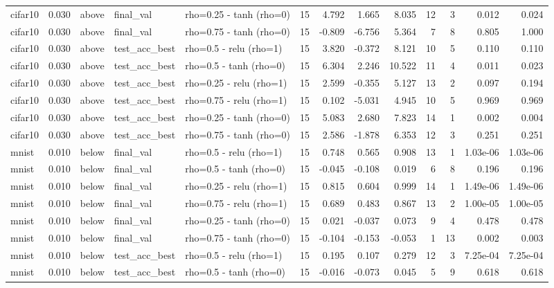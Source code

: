 \begin{table}[htbp]
{\begin{tabular}{@{}lrlllrrrrrrrr@{}}
cifar10 & 0.030 & above & final\_val & rho=0.25 - tanh (rho=0) & 15 & 4.792 & 1.665 & 8.035 & 12 & 3 & 0.012 & 0.024 \\
cifar10 & 0.030 & above & final\_val & rho=0.75 - tanh (rho=0) & 15 & -0.809 & -6.756 & 5.364 & 7 & 8 & 0.805 & 1.000 \\
cifar10 & 0.030 & above & test\_acc\_best & rho=0.5 - relu (rho=1) & 15 & 3.820 & -0.372 & 8.121 & 10 & 5 & 0.110 & 0.110 \\
cifar10 & 0.030 & above & test\_acc\_best & rho=0.5 - tanh (rho=0) & 15 & 6.304 & 2.246 & 10.522 & 11 & 4 & 0.011 & 0.023 \\
cifar10 & 0.030 & above & test\_acc\_best & rho=0.25 - relu (rho=1) & 15 & 2.599 & -0.355 & 5.127 & 13 & 2 & 0.097 & 0.194 \\
cifar10 & 0.030 & above & test\_acc\_best & rho=0.75 - relu (rho=1) & 15 & 0.102 & -5.031 & 4.945 & 10 & 5 & 0.969 & 0.969 \\
cifar10 & 0.030 & above & test\_acc\_best & rho=0.25 - tanh (rho=0) & 15 & 5.083 & 2.680 & 7.823 & 14 & 1 & 0.002 & 0.004 \\
cifar10 & 0.030 & above & test\_acc\_best & rho=0.75 - tanh (rho=0) & 15 & 2.586 & -1.878 & 6.353 & 12 & 3 & 0.251 & 0.251 \\
mnist & 0.010 & below & final\_val & rho=0.5 - relu (rho=1) & 15 & 0.748 & 0.565 & 0.908 & 13 & 1 & 1.03e-06 & 1.03e-06 \\
mnist & 0.010 & below & final\_val & rho=0.5 - tanh (rho=0) & 15 & -0.045 & -0.108 & 0.019 & 6 & 8 & 0.196 & 0.196 \\
mnist & 0.010 & below & final\_val & rho=0.25 - relu (rho=1) & 15 & 0.815 & 0.604 & 0.999 & 14 & 1 & 1.49e-06 & 1.49e-06 \\
mnist & 0.010 & below & final\_val & rho=0.75 - relu (rho=1) & 15 & 0.689 & 0.483 & 0.867 & 13 & 2 & 1.00e-05 & 1.00e-05 \\
mnist & 0.010 & below & final\_val & rho=0.25 - tanh (rho=0) & 15 & 0.021 & -0.037 & 0.073 & 9 & 4 & 0.478 & 0.478 \\
mnist & 0.010 & below & final\_val & rho=0.75 - tanh (rho=0) & 15 & -0.104 & -0.153 & -0.053 & 1 & 13 & 0.002 & 0.003 \\
mnist & 0.010 & below & test\_acc\_best & rho=0.5 - relu (rho=1) & 15 & 0.195 & 0.107 & 0.279 & 12 & 3 & 7.25e-04 & 7.25e-04 \\
mnist & 0.010 & below & test\_acc\_best & rho=0.5 - tanh (rho=0) & 15 & -0.016 & -0.073 & 0.045 & 5 & 9 & 0.618 & 0.618 \\

\end{tabular}}
\end{table}
